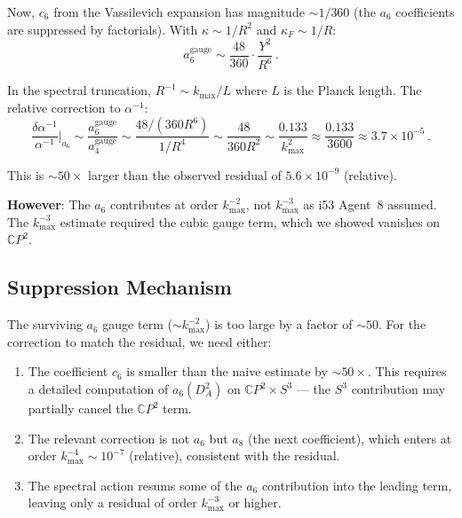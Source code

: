 \documentclass[11pt,a4paper]{article}
\newcommand{\CP}{\mathbb{C}P}
\begin{document}
Now, $c_6$ from the Vassilevich expansion has magnitude $\sim 1/360$ (the $a_6$ coefficients are suppressed by factorials). With $\kappa \sim 1/R^2$ and $\kappa_F \sim 1/R$:
\begin{equation}
a_6^{\mathrm{gauge}} \sim \frac{48}{360} \cdot \frac{Y^2}{R^6}\,.
\end{equation}

In the spectral truncation, $R^{-1} \sim k_{\max}/L$ where $L$ is the Planck length. The relative correction to $\alpha^{-1}$:
\begin{equation}
\frac{\delta\alpha^{-1}}{\alpha^{-1}}\bigg|_{a_6} \sim \frac{a_6^{\mathrm{gauge}}}{a_4^{\mathrm{gauge}}} \sim \frac{48/(360 R^6)}{1/R^4} \sim \frac{48}{360 R^2} \sim \frac{0.133}{k_{\max}^2} \approx \frac{0.133}{3600} \approx 3.7 \times 10^{-5}\,.
\end{equation}

This is $\sim 50\times$ larger than the observed residual of $5.6 \times 10^{-9}$ (relative).

\textbf{However}: The $a_6$ contributes at order $k_{\max}^{-2}$, not $k_{\max}^{-3}$ as i53 Agent~8 assumed. The $k_{\max}^{-3}$ estimate required the cubic gauge term, which we showed vanishes on $\CP^2$.

\subsection{Suppression Mechanism}

The surviving $a_6$ gauge term ($\sim k_{\max}^{-2}$) is too large by a factor of $\sim 50$. For the correction to match the residual, we need either:

\begin{enumerate}
\item The coefficient $c_6$ is smaller than the naive estimate by $\sim 50\times$. This requires a detailed computation of $a_6(D_A^2)$ on $\CP^2 \times S^3$ --- the $S^3$ contribution may partially cancel the $\CP^2$ term.

\item The relevant correction is not $a_6$ but $a_8$ (the next coefficient), which enters at order $k_{\max}^{-4} \sim 10^{-7}$ (relative), consistent with the residual.

\item The spectral action resums some of the $a_6$ contribution into the leading term, leaving only a residual of order $k_{\max}^{-3}$ or higher.
\end{enumerate}
\end{document}

